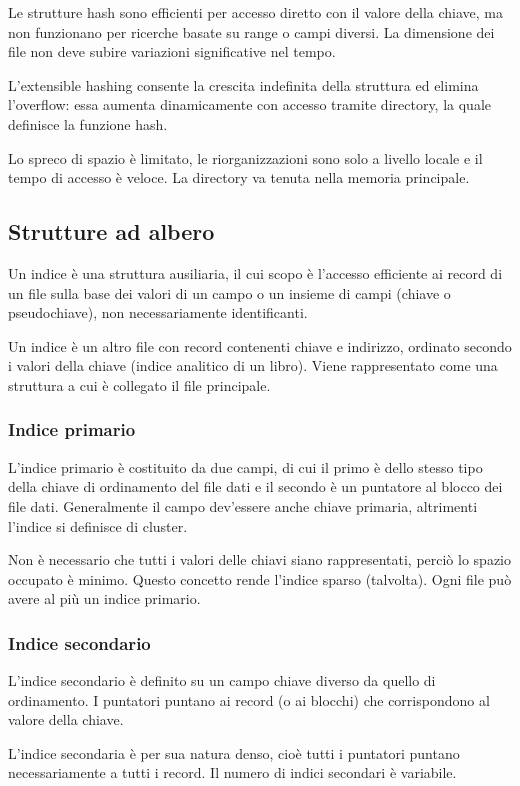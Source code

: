 Le strutture hash sono efficienti per accesso diretto con il valore della chiave, ma non funzionano per ricerche basate su range o campi diversi. La dimensione dei file non deve subire variazioni significative nel tempo.

L'extensible hashing consente la crescita indefinita della struttura ed elimina l'overflow: essa aumenta dinamicamente con accesso tramite directory, la quale definisce la funzione hash. 

Lo spreco di spazio è limitato, le riorganizzazioni sono solo a livello locale e il tempo di accesso è veloce. La directory va tenuta nella memoria principale.

\subsection{Strutture ad albero}
Un indice è una struttura ausiliaria, il cui scopo è l'accesso efficiente ai record di un file sulla base dei valori di un campo o un insieme di campi (chiave o pseudochiave), non necessariamente identificanti.

Un indice è un altro file con record contenenti chiave e indirizzo, ordinato secondo i valori della chiave (indice analitico di un libro). Viene rappresentato come una struttura a cui è collegato il file principale.

\subsubsection{Indice primario}
L'indice primario è costituito da due campi, di cui il primo è dello stesso tipo della chiave di ordinamento del file dati e il secondo è un puntatore al blocco dei file dati. Generalmente il campo dev'essere anche chiave primaria, altrimenti l'indice si definisce di cluster.

Non è necessario che tutti i valori delle chiavi siano rappresentati, perciò lo spazio occupato è minimo. Questo concetto rende l'indice sparso (talvolta). Ogni file può avere al più un indice primario.

\subsubsection{Indice secondario}
L'indice secondario è definito su un campo chiave diverso da quello di ordinamento. I puntatori puntano ai record (o ai blocchi) che corrispondono al valore della chiave.

L'indice secondaria è per sua natura denso, cioè tutti i puntatori puntano necessariamente a tutti i record. Il numero di indici secondari è variabile.

